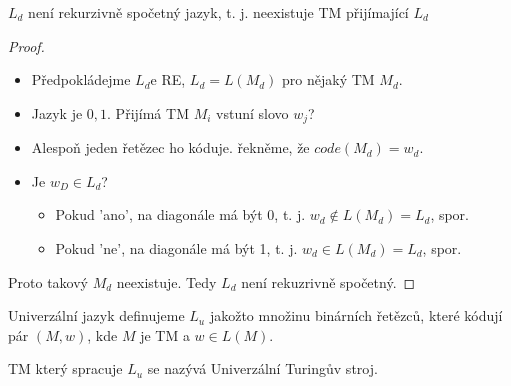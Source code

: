 \documentclass[../main.tex]{subfiles}
\begin{document}
\begin{theorem}
    $L_d$ není rekurzivně spočetný jazyk, t. j. neexistuje TM přijímající $L_d$
    \begin{proof}
        \begin{itemize}
            \item Předpokládejme $L_d$e RE, $L_d = L(M_d)$ pro nějaký TM $M_d$.
            \item Jazyk je ${0,1}$. Přijímá TM $M_i$ vstuní slovo $w_j$?
            \item Alespoň jeden řetězec ho kóduje. řekněme, že $code(M_d) = w_d.$
            \item Je $w_D \in L_d$? 
            \begin{itemize}
                \item Pokud 'ano', na diagonále má být 0, t. j. $w_d \notin L(M_d) = L_d$, spor.
                \item Pokud 'ne', na diagonále má být 1, t. j. $w_d \in L(M_d) = L_d$, spor.
            \end{itemize}
        \end{itemize}
        Proto takový $M_d$ neexistuje. Tedy $L_d$ není rekuzrivně spočetný.
    \end{proof}
\end{theorem}
\begin{definition}
    Univerzální jazyk definujeme $L_u$ jakožto množinu binárních řetězců, které kódují pár $(M,w)$, kde $M$ je TM a $w \in L(M)$.

    TM který spracuje $L_u$ se nazývá Univerzální Turingův stroj.
\end{definition}
\end{document}
